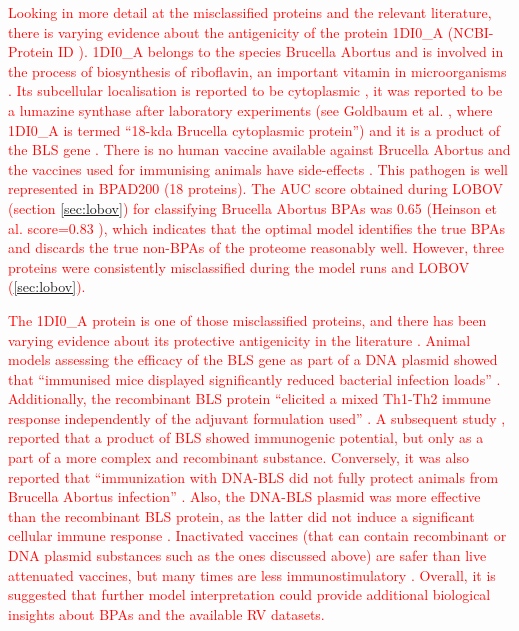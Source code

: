 \documentclass[10pt,journal,compsoc,twoside]{IEEEtran}
\begin{document}
\textcolor{red}{Looking in more detail at the misclassified proteins and the relevant literature, there is varying evidence about the antigenicity of the protein 1DI0\_A (NCBI-Protein ID \cite{1DI0_A}). 1DI0\_A belongs to the species Brucella Abortus and is involved in the process of biosynthesis of riboflavin, an important vitamin in microorganisms \cite{riboflavin}. Its subcellular localisation is reported to be cytoplasmic \cite{psortb}, it was reported to be a lumazine synthase after laboratory experiments (see Goldbaum et al. \cite{goldbaum_velikovsky_1999}, where 1DI0\_A is termed “18-kda Brucella cytoplasmic protein”) and it is a product of the BLS gene \cite{BLS}. There is no human vaccine available against Brucella Abortus \cite{new-gen-brucella-vaccines} and the vaccines used for immunising animals have side-effects \cite{dorneles_2015}. This pathogen is well represented in BPAD200 (18 proteins). The AUC score obtained during LOBOV (section \ref{sec:lobov}) for classifying Brucella Abortus BPAs was 0.65 (Heinson et al. score=0.83 \cite{heinson_2019}), which indicates that the optimal model identifies the true BPAs and discards the true non-BPAs of the proteome reasonably well. However, three proteins were consistently misclassified during the model runs and LOBOV (\ref{sec:lobov}).}

\textcolor{red}{The 1DI0\_A protein is one of those misclassified proteins, and there has been varying evidence about its protective antigenicity in the literature \cite{velikovsky_goldbaum_bowden_2002,velikovsky_goldbaum_bowden_2003,laplagne_2004}. Animal models assessing the efficacy of the BLS gene as part of a DNA plasmid showed that “immunised mice displayed significantly reduced bacterial infection loads” \cite{velikovsky_goldbaum_bowden_2002}. Additionally, the recombinant BLS protein “elicited a mixed Th1-Th2 immune response independently of the adjuvant formulation used” \cite{velikovsky_goldbaum_bowden_2003}. A subsequent study \cite{laplagne_2004}, reported that a product of BLS showed immunogenic potential, but only as a part of a more complex and recombinant substance. Conversely, it was also reported that “immunization with DNA-BLS did not fully protect animals from Brucella Abortus infection” \cite{velikovsky_goldbaum_bowden_2002}. Also, the DNA-BLS plasmid was more effective than the recombinant BLS protein, as the latter did not induce a significant cellular immune response \cite{velikovsky_goldbaum_bowden_2002}. Inactivated vaccines (that can contain recombinant or DNA plasmid substances such as the ones discussed above) are safer than live attenuated vaccines, but many times are less immunostimulatory \cite{vaccine-immunology_fundamentals}. Overall, it is suggested that further model interpretation could provide additional biological insights about BPAs and the available RV datasets.}
\end{document}
